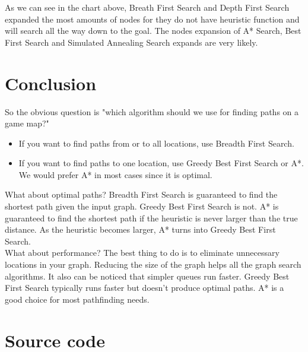 \documentclass[a4paper]{article}
\begin{document}
As we can see in the chart above, Breath First Search and Depth First Search expanded the most amounts of nodes for they do not have heuristic function and will search all the way down to the goal.  The nodes expansion of A* Search, Best First Search and Simulated Annealing Search expands are very likely. \\




\section{Conclusion}

So the obvious question is "which algorithm should we use for finding paths on a game map?"

\begin{itemize}
\item If you want to find paths from or to all locations, use Breadth First Search.
\item If you want to find paths to one location, use Greedy Best First Search or A*. We would prefer A* in most cases since it is optimal.
\end{itemize}

What about optimal paths? Breadth First Search is guaranteed to find the shortest path given the input graph. Greedy Best First Search is not. A* is guaranteed to find the shortest path if the heuristic is never larger than the true distance. As the heuristic becomes larger, A* turns into Greedy Best First Search.\\

What about performance? The best thing to do is to eliminate unnecessary locations in your graph. Reducing the size of the graph helps all the graph search algorithms. It also can be noticed that simpler queues run faster. Greedy Best First Search typically runs faster but doesn’t produce optimal paths. A* is a good choice for most pathfinding needs. \\


\section{Source code}
\end{document}
